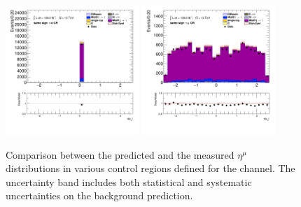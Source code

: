 \begin{figure}[!htp]
\begin{center}
			\includegraphics[width=0.45\textwidth]{chapters/chapter6_HPlus/images/taulep/mu_0_eta_SS_TAUEL.png} 
			\includegraphics[width=0.45\textwidth]{chapters/chapter6_HPlus/images/taulep/mu_0_eta_SS_TAUMU.png} \\
			\end{center}
			\caption{
			Comparison between the predicted and the measured $\eta^{\mu}$ distributions in various control regions defined for the \taulep channel. The uncertainty band includes both statistical and systematic uncertainties on the background prediction. 
			}
			\label{fig:bkg-eta-mu-taulep}
		\end{figure}

